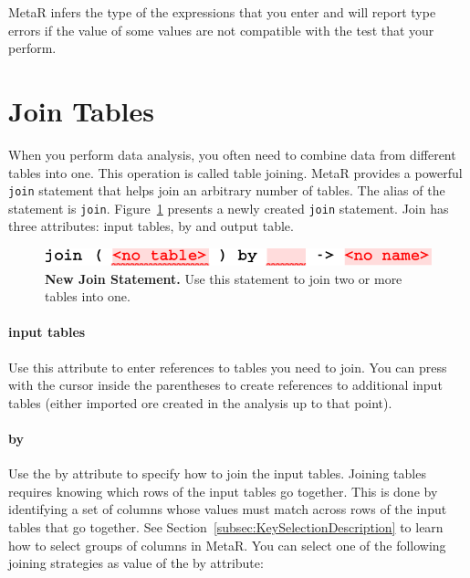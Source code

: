 \begin{remark}
MetaR infers the type of the expressions that you enter and will report type errors if the value of some values are not compatible with the test that your perform.
\end{remark}

\section{Join Tables}
When you perform data analysis, you often need to combine data from different tables into one. This operation is called table joining. MetaR provides a powerful \texttt{join} statement that helps join an arbitrary number of tables. The alias of the statement is \texttt{join}. Figure~\ref{fig:NewJoinStatement} presents a newly created \texttt{join} statement. Join has three attributes: input tables, by and output table.

\begin{figure}
  \centering
  \includegraphics[width=\figWidthNarrow]{figures/NewJoinStatement.pdf}
\caption[New Join Statement.]{\textbf{New Join Statement.} Use this statement to join two or more tables into one.}
\label{fig:NewJoinStatement}
\end{figure}

\paragraph{input tables}
Use this attribute to enter references to tables you need to join. You can press \keys{\return} with the cursor inside the parentheses to create references to additional input tables (either imported ore created in the analysis up to that point).
\paragraph{by}
Use the by attribute to specify how to join the input tables. Joining tables requires knowing which rows of the input tables go together. This is done by identifying a set of columns whose values must match across rows of the input tables that go together. See Section~\ref{subsec:KeySelectionDescription} to learn how to select groups of columns in MetaR. You can select one of the following joining strategies as value of the by attribute:

